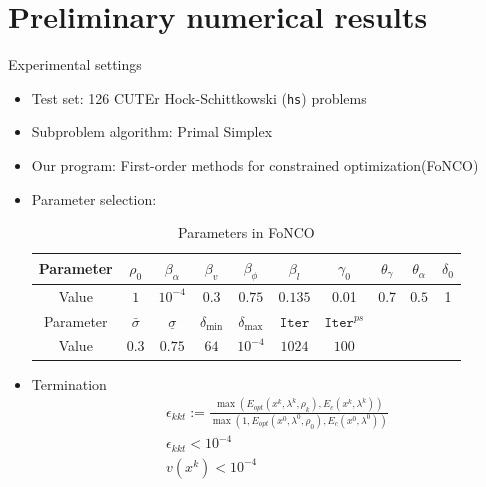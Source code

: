 \documentclass[8pt]{beamer}
\begin{document}
\section{Preliminary numerical results}
			
	\begin{frame}{Experimental settings}
		\begin{itemize}
			\item Test set:  126 CUTEr Hock-Schittkowski (\texttt{hs}) problems
		\vfill
			\item Subproblem algorithm: Primal Simplex
		\vfill
			\item Our program: First-order methods for constrained optimization(FoNCO)
		\vfill
			\item Parameter selection:   
				\begin{table}[H]
				\centering
				\caption{Parameters in FoNCO}
				\label{tab.para}
				\begin{tabular}{c|ccccccccc}\hline
					Parameter  & $\rho_0$   &  $\beta_\alpha$  &  $\beta_v$& $\beta_\phi$ & $\beta_l$                  &  $\gamma_0$  &  $\theta_\gamma$   & $\theta_\alpha$    & $\delta_0$    \\ \hline 
					Value   &   $1$    &  $10^{-4}     $  &  $0.3    $& $0.75$       & $0.135$ &     0.01     &  0.7   &   $0.5$  & 1  \\  \hline\hline

				Parameter &      $\bar\sigma$     &  $\underline{\sigma}$  &  $\delta_{\min} $  &    $\delta_{\max}$      & $\texttt{Iter}$ & $\texttt{Iter}^{ps}$  &  & & \\  \hline
					Value &           $0.3$  &   $0.75$  &  $64$       &   $10^{-4}$  &        $1024$   &  $100$ & & & \\  \hline
				\end{tabular}\end{table}
		\vfill
			\item Termination 
				\begin{equation}\label{relative.kkt}\begin{aligned}
					& \epsilon_{kkt} := \frac{\max(E_{opt}(x^k, \lambda^k, \rho_k), E_c(x^k, \lambda^k))}{\max(1, E_{opt}(x^0, \lambda^0, \rho_0), E_c(x^0, \lambda^0))}\\
					& \epsilon_{kkt} < 10^{-4} \\
					& v(x^k) < 10^{-4}
				\end{aligned}\end{equation}
		\end{itemize}
	\end{frame}
\end{document}
